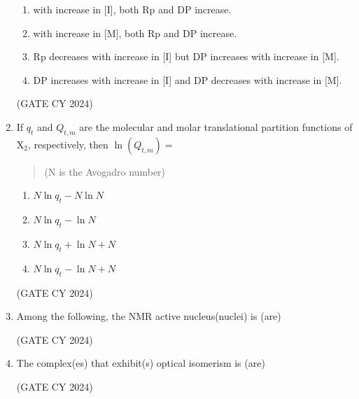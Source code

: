 \documentclass[12pt]{article}
\begin{document}
\begin{enumerate}
\begin{enumerate}
\item with increase in [I], both Rp and DP increase.
\item with increase in [M], both Rp and DP increase.
\item Rp decreases with increase in [I] but DP increases with increase in [M].
\item DP increases with increase in [I] and DP decreases with increase in [M].
\end{enumerate}

\hfill (GATE CY 2024)

\item If $q_t$ and $Q_{t,m}$ are the molecular and molar translational partition functions of X$_2$, respectively, then $\ln(Q_{t,m}) =$

\begin{quote}
(N is the Avogadro number)
\end{quote}

\begin{multicols}{2}
\begin{enumerate}
\item $N \ln q_t - N \ln N$

\item $N \ln q_t - \ln N$

\item $N \ln q_t + \ln N + N$

\item $N \ln q_t - \ln N + N$
\end{enumerate}
\end{multicols}
\hfill (GATE CY 2024)

\item Among the following, the NMR active nucleus(nuclei) is (are)

\begin{enumerate}
\end{enumerate}
\hfill (GATE CY 2024)

\item The complex(es) that exhibit(s) optical isomerism is (are)

\begin{enumerate}
\end{enumerate}
\hfill (GATE CY 2024)


\end{enumerate}
\end{document}
